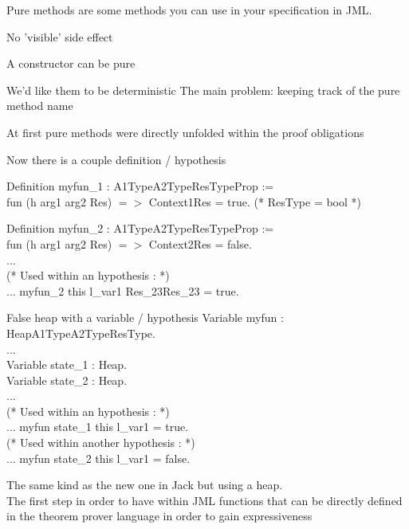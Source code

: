 Pure methods are some methods you can {\purple use in your specification} 
in JML.
\blist \small
\item No 'visible' side effect
\item A constructor can be pure
\item We'd like them to be deterministic
\elist
The main problem: keeping track of the pure method name


\small
\blist
\item At first pure methods were directly unfolded 
  within the proof obligations
\item Now there is a couple definition / hypothesis \\
\elist

{\purple Definition} myfun\_1 : A1Type\rarrow A2Type\rarrow ResType\rarrow Prop :=\\
{\purple fun} (h arg1 arg2 Res) {\purple $=>$} Context1\rarrow Res = true. (* ResType = bool *)

{\purple Definition} myfun\_2 : A1Type\rarrow A2Type\rarrow ResType\rarrow Prop :=\\
{\purple fun} (h arg1 arg2 Res) {\purple $=>$} Context2\rarrow Res = false.\\
...\\
(* Used within an hypothesis : *)\\
... \rarrow myfun\_2 this l\_var1 Res\_23\rarrow Res\_23 = true.\\

\small
\blist
\item False heap with a variable / hypothesis
\elist
{\purple Variable} myfun :  Heap\rarrow A1Type\rarrow A2Type\rarrow ResType.\\
...\\
{\purple Variable} state\_1 : Heap.\\
{\purple Variable} state\_2 : Heap.\\
...\\
(* Used within an hypothesis : *)\\
... \rarrow myfun state\_1 this l\_var1 = true.\\
(* Used within another hypothesis : *)\\
... \rarrow myfun state\_2 this l\_var1 = false.\\
\small
\blist
\item The same kind as the new one in Jack but using a heap.\\
\rarrow The first step in order to have within JML functions
that can be directly defined in the theorem prover language in order to
gain {\purple expressiveness}
\elist

